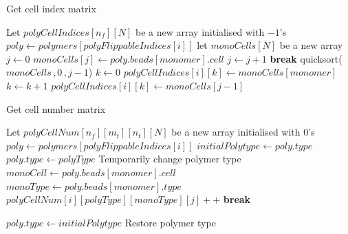 \documentclass[bachelor,       %
               twoside,        %
               BCOR10mm,       %
               ngerman, english %
               ]{GAUBM}
\begin{document}
\begin{algorithm}
\caption{Get cell index matrix}\label{alg:get_cell_indices}
\begin{algorithmic}
\State Let $polyCellIndices[n_f][N]$ be a new array initialised with $-1$'s
    \State $poly \gets polymers[polyFlippableIndices[i]]$
    \State let $monoCells[N]$ be a new array
    \State $j\gets 0$
            \State $monoCells[j]\gets poly.beads[monomer].cell$
            \State $j\gets j+1$
            \State \textbf{break}
        \EndIf
    \EndFor
    \State quicksort($monoCells\,,0\,,j-1$)
    \State $k\gets 0$
            \State $polyCellIndices[i][k]\gets monoCells[monomer]$
            \State $k\gets k+1$
        \EndIf
    \EndFor
    \State $polyCellIndices[i][k]\gets monoCells[j-1]$
\EndFor
\end{algorithmic}
\end{algorithm}



\begin{algorithm}
\caption{Get cell number matrix}\label{alg:get_cell_numbers}
\begin{algorithmic}
\State Let $polyCellNum[n_f][m_t][n_t][N]$ be a new array initialised with $0$'s
    \State $poly \gets polymers[polyFlippableIndices[i]]$
    \State $initialPolytype\gets poly.type$
        \State $poly.type\gets polyType$
        \Comment Temporarily change polymer type
            \State $monoCell\gets poly.beads[monomer].cell$
            \State $monoType\gets poly.beads[monomer].type$
                \State $polyCellNum[i][polyType][monoType][j]++$ 
                \State \textbf{break}
            \EndIf
            \EndFor
        \EndFor
    \EndFor
    
    \State $poly.type\gets initialPolytype$
    \Comment Restore polymer type
\EndFor
\end{algorithmic}
\end{algorithm}
\end{document}

